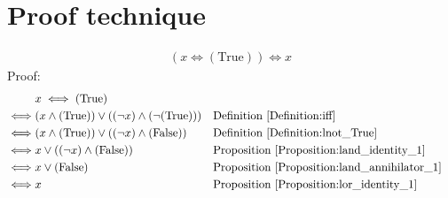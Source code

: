 \section{Proof technique}
\begin{prop}
\begin{align*}
(x \iff (\text{True})) \iff x
\end{align*}
Proof:
\begin{align*}
& x \iff (\text{True}) \\
\iff & (x \land (\text{True})) \lor ((\lnot x) \land (\lnot (\text{True})))
&& \text{Definition \ref{Definition:iff}} \\
\iff & (x \land (\text{True})) \lor ((\lnot x) \land (\text{False}))
&& \text{Definition \ref{Definition:lnot_True}} \\
\iff & x \lor ((\lnot x) \land (\text{False}))
&& \text{Proposition \ref{Proposition:land_identity_1}} \\
\iff & x \lor (\text{False})
&& \text{Proposition \ref{Proposition:land_annihilator_1}} \\
\iff & x
&& \text{Proposition \ref{Proposition:lor_identity_1}} \\
\end{align*}
\end{prop}

